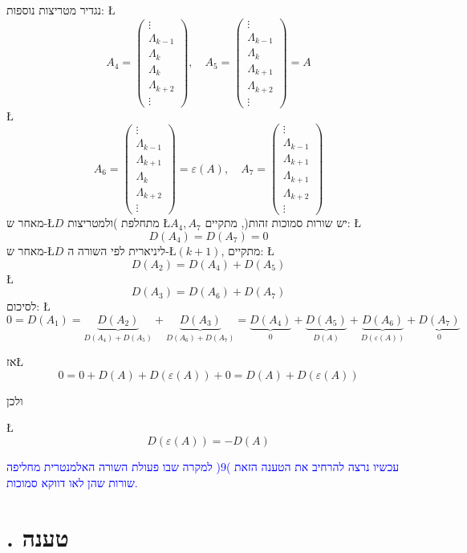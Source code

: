 \documentclass[english,hebrew]{article}
\begin{document}
נגדיר מטריצות נוספות: \L{%
\[
A_{4}=\begin{pmatrix}\vdots\\
\Lambda_{k-1}\\
\Lambda_{k}\\
\Lambda_{k}\\
\Lambda_{k+2}\\
\vdots
\end{pmatrix},\quad A_{5}=\begin{pmatrix}\vdots\\
\Lambda_{k-1}\\
\Lambda_{k}\\
\Lambda_{k+1}\\
\Lambda_{k+2}\\
\vdots
\end{pmatrix}=A
\]
}%
\L{%
\[
A_{6}=\begin{pmatrix}\vdots\\
\Lambda_{k-1}\\
\Lambda_{k+1}\\
\Lambda_{k}\\
\Lambda_{k+2}\\
\vdots
\end{pmatrix}=\varepsilon(A),\quad A_{7}=\begin{pmatrix}\vdots\\
\Lambda_{k-1}\\
\Lambda_{k+1}\\
\Lambda_{k+1}\\
\Lambda_{k+2}\\
\vdots
\end{pmatrix}
\]
}%
מאחר ש-\L{$D$} מתחלפת )ולמטריצות \L{$A_{4},A_{7}$} יש שורות סמוכות
זהות(, מתקיים: \L{%
\[
D(A_{4})=D(A_{7})=0
\]
}%
מאחר ש-\L{$D$} ליניארית לפי השורה ה-\L{$(k+1)$}, מתקיים: \L{%
\[
D(A_{2})=D(A_{4})+D(A_{5})
\]
}%
\L{%
\[
D(A_{3})=D(A_{6})+D(A_{7})
\]
}%
לסיכום: \L{%
\[
0=D(A_{1})=\underbrace{D(A_{2})}_{D(A_{4})+D(A_{5})}+\underbrace{D(A_{3})}_{D(A_{6})+D(A_{7})}=\underbrace{D(A_{4})}_{0}+\underbrace{D(A_{5})}_{D(A)}+\underbrace{D(A_{6})}_{D(\varepsilon(A))}+\underbrace{D(A_{7})}_{0}
\]
}%

אז\L{%
\[
0=0+D(A)+D(\varepsilon(A))+0=D(A)+D(\varepsilon(A))
\]
}%

ולכן

\L{%
\[
D(\varepsilon(A))=-D(A)
\]
}%
\medskip{}

\textcolor{blue}{עכשיו נרצה להרחיב את הטענה הזאת )9( למקרה שבו פעולת
השורה האלמנטרית מחליפה שורות שהן לאו דווקא סמוכות.}

\section{{\endL}. טענה}
\end{document}
